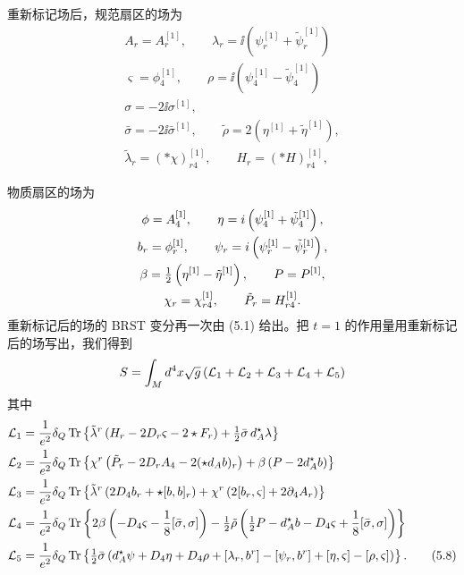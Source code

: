 重新标记场后，规范扇区的场为
\begin{gather*}
    A_r = A_r^{[1]}, \qquad \lambda_r = \ii\left(\psi_r^{[1]} + \tilde\psi_r^{[1]}\right) \\
    \varsigma = \phi_4^{[1]}, \qquad \rho = \ii\left(\psi_4^{[1]} - \tilde\psi_4^{[1]}\right) \\
    \sigma = -2\ii\sigma^{[1]}, \\
    \bar\sigma = -2\ii\bar\sigma^{[1]}, \qquad \tilde\rho = 2\left(\eta^{[1]} + \tilde\eta^{[1]}\right), \\
    \tilde\lambda_r = (\ast\chi)_{r4}^{[1]}, \qquad H_r = (\ast H)_{r4}^{[1]},
\end{gather*}

物质扇区的场为
\begin{gather*}
    \phi = A_4^{[1]}, \qquad \eta = i\left(\psi_4^{[1]} + \tilde\psi_4^{[1]}\right), \\
    b_r = \phi_r^{[1]}, \qquad \psi_r = i\left(\psi_r^{[1]} - \tilde\psi_r^{[1]}\right), \\
    \beta = \tfrac{1}{2}\left(\eta^{[1]} - \tilde\eta^{[1]}\right), \qquad P = P^{[1]}, \\
    \chi_r = \chi_{r4}^{[1]}, \qquad \tilde P_r = H_{r4}^{[1]} .
\end{gather*}
重新标记后的场的 BRST 变分再一次由 (5.1) 给出。把 $t=1$ 的作用量用重新标记后的场写出，我们得到
\[
    S = \int_Md^4x\sqrt{g}\left(\mathcal{L}_1+\mathcal{L}_2+\mathcal{L}_3+\mathcal{L}_4+\mathcal{L}_5\right)
\]
其中
\begin{align}
    \mathcal{L}_1 &= \frac{1}{e^2}\delta_Q\operatorname{Tr}\left\{\tilde\lambda^r\left(H_r - 2D_r\varsigma - 2\star F_r\right) + \tfrac{1}{2}\bar\sigma\, d_A^\star\lambda\right\} \notag\\
    \mathcal{L}_2 &= \frac{1}{e^2}\delta_Q\operatorname{Tr}\left\{\chi^r\left(\tilde P_r - 2D_rA_4 - 2(\star d_Ab)_r\right) + \beta\left(P - 2d_A^\star b\right)\right\} \notag\\
    \mathcal{L}_3 &= \frac{1}{e^2}\delta_Q\operatorname{Tr}\left\{\tilde\lambda^r\left(2D_4b_r + \star[b,b]_r\right) + \chi^r\left(2[b_r,\varsigma] + 2\partial_4A_r\right)\right\} \notag\\
    \mathcal{L}_4 &= \frac{1}{e^2}\delta_Q\operatorname{Tr}\left\{2\beta\left(-D_4\varsigma - \frac{1}{8}[\bar\sigma,\sigma]\right)
        - \tfrac{1}{2}\tilde\rho\left(\tfrac{1}{2} P - d_A^\star b - D_4\varsigma + \frac{1}{8}[\bar\sigma,\sigma]\right)\right\} \notag\\
    \mathcal{L}_5 &= \frac{1}{e^2}\delta_Q\operatorname{Tr}\left\{\tfrac{1}{2}\bar\sigma\left(d_A^\star\psi + D_4\eta + D_4\rho + [\lambda_r,b^r] - [\psi_r,b^r] + [\eta,\varsigma] - [\rho,\varsigma]\right)\right\} . \tag{5.8}
\end{align}

